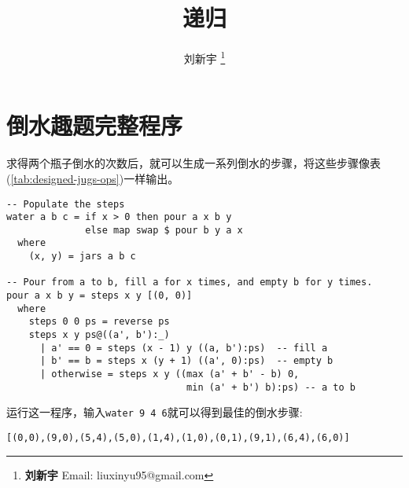 \documentclass[UTF8]{article}
\begin{document}
\title{递归}

\author{刘新宇
\thanks{{\bfseries 刘新宇} \newline
  Email: liuxinyu95@gmail.com \newline}
  }

\maketitle
\fi


\chapter*{倒水趣题完整程序}

求得两个瓶子倒水的次数后，就可以生成一系列倒水的步骤，将这些步骤像表(\cref{tab:designed-jugs-ops})一样输出。

\lstset{frame=single}
\begin{lstlisting}
-- Populate the steps
water a b c = if x > 0 then pour a x b y
              else map swap $ pour b y a x
  where
    (x, y) = jars a b c

-- Pour from a to b, fill a for x times, and empty b for y times.
pour a x b y = steps x y [(0, 0)]
  where
    steps 0 0 ps = reverse ps
    steps x y ps@((a', b'):_)
      | a' == 0 = steps (x - 1) y ((a, b'):ps)  -- fill a
      | b' == b = steps x (y + 1) ((a', 0):ps)  -- empty b
      | otherwise = steps x y ((max (a' + b' - b) 0,
                                min (a' + b') b):ps) -- a to b
\end{lstlisting}

运行这一程序，输入\texttt{water 9 4 6}就可以得到最佳的倒水步骤:

\begin{verbatim}
[(0,0),(9,0),(5,4),(5,0),(1,4),(1,0),(0,1),(9,1),(6,4),(6,0)]
\end{verbatim}

\ifx\wholebook\relax \else
%
\expandafter\enddocument

\fi
\end{document}
